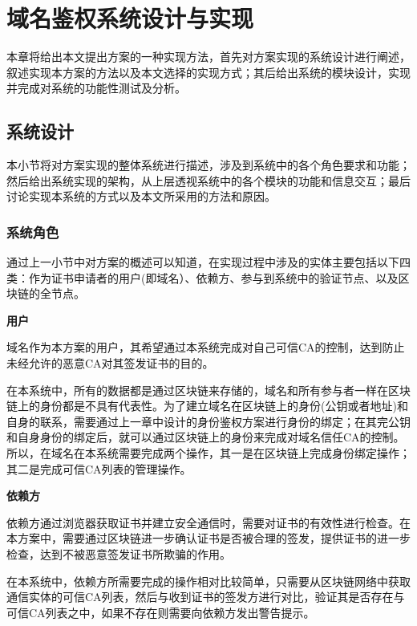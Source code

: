 
\chapter{域名鉴权系统设计与实现}

本章将给出本文提出方案的一种实现方法，首先对方案实现的系统设计进行阐述，叙述实现本方案的方法以及本文选择的实现方式；其后给出系统的模块设计，实现并完成对系统的功能性测试及分析。

\section{系统设计}

本小节将对方案实现的整体系统进行描述，涉及到系统中的各个角色要求和功能；然后给出系统实现的架构，从上层透视系统中的各个模块的功能和信息交互；最后讨论实现本系统的方式以及本文所采用的方法和原因。

\subsection{系统角色}


通过上一小节中对方案的概述可以知道，在实现过程中涉及的实体主要包括以下四类：作为证书申请者的用户(即域名）、依赖方、参与到系统中的验证节点、以及区块链的全节点。


\noindent\textbf{用户}

域名作为本方案的用户，其希望通过本系统完成对自己可信CA的控制，达到防止未经允许的恶意CA对其签发证书的目的。

在本系统中，所有的数据都是通过区块链来存储的，域名和所有参与者一样在区块链上的身份都是不具有代表性。为了建立域名在区块链上的身份(公钥或者地址)和自身的联系，需要通过上一章中设计的身份鉴权方案进行身份的绑定；在其完公钥和自身身份的绑定后，就可以通过区块链上的身份来完成对域名信任CA的控制。所以，在域名在本系统需要完成两个操作，其一是在区块链上完成身份绑定操作；其二是完成可信CA列表的管理操作。


\noindent\textbf{依赖方}

依赖方通过浏览器获取证书并建立安全通信时，需要对证书的有效性进行检查。在本方案中，需要通过区块链进一步确认证书是否被合理的签发，提供证书的进一步检查，达到不被恶意签发证书所欺骗的作用。

在本系统中，依赖方所需要完成的操作相对比较简单，只需要从区块链网络中获取通信实体的可信CA列表，然后与收到证书的签发方进行对比，验证其是否存在与可信CA列表之中，如果不存在则需要向依赖方发出警告提示。


